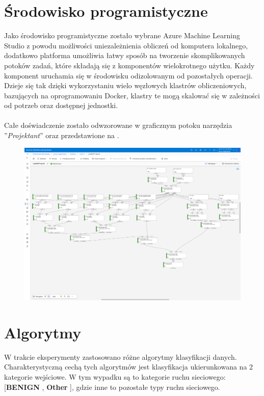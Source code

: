 \section{Środowisko programistyczne}
Jako środowisko programistyczne zostało wybrane Azure Machine Learning Studio z powodu możliwości uniezależnienia obliczeń od komputera lokalnego, dodatkowo platforma umożliwia łatwy sposób na tworzenie skomplikowanych potoków zadań, które składają się z komponentów wielokrotnego użytku. Każdy komponent uruchamia się w środowisku odizolowanym od pozostałych operacji. Dzieje się tak dzięki wykorzystaniu wielo węzłowych klastrów obliczeniowych, bazujących na oprogramowaniu Docker, klastry te mogą skalować się w zależności od potrzeb oraz dostępnej jednostki\cite{MicrosoftLearn2023}.
\\ \\
Całe doświadczenie zostało odwzorowane w graficznym potoku narzędzia ''\textit{Projektant}'' oraz przedstawione na .

\begin{landscape}
    \centering
\begin{figure}[H]
    \centering
    \includegraphics[height=0.9\textwidth]{images/pipeline}
    \label{fig:pipeline}
\end{figure}
\end{landscape}

\section{Algorytmy}
\label{sec:alg}
W trakcie eksperymenty zastosowano różne algorytmy klasyfikacji danych. Charakterystyczną cechą tych algorytmów jest klasyfikacja ukierunkowana na 2 kategorie wejściowe. W tym wypadku są to kategorie ruchu sieciowego: [\textbf{BENIGN} , \textbf{Other} ], gdzie inne to pozostałe typy ruchu sieciowego.

